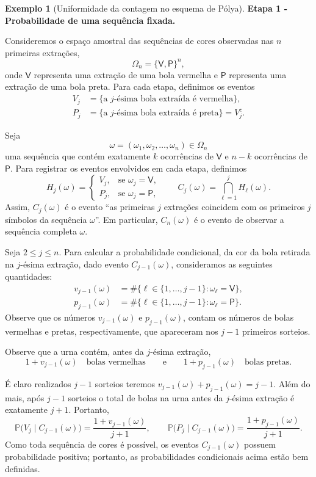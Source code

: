 \documentclass[12pt,portuguese]{article}
\theoremstyle{definition}
\newtheorem{example}[example]{Exemplo}
\begin{document}
\begin{example}[Uniformidade da contagem no esquema de Pólya]
\smallskip
\noindent\textbf{Etapa 1 - Probabilidade de uma sequência fixada.}

Consideremos o espaço amostral das sequências de cores observadas nas $n$ primeiras extrações,
\[
  \Omega_n = \{\mathsf{V},\mathsf{P}\}^n,
\]
onde $\mathsf{V}$ representa uma extração de uma bola vermelha e $\mathsf{P}$ representa uma extração de uma bola preta. Para cada etapa, definimos os eventos
\[
  \begin{aligned}
    V_j &= \{\text{a $j$-ésima bola extraída é vermelha}\}, \\
    P_j &= \{\text{a $j$-ésima bola extraída é preta}\}=V_j^c.
  \end{aligned}
\]

Seja
\[
  \omega=(\omega_1,\omega_2,\ldots,\omega_n) \in \Omega_n
\]
uma sequência que contém exatamente $k$ ocorrências de $\mathsf{V}$ e $n-k$ ocorrências de $\mathsf{P}$. Para registrar os eventos envolvidos em cada etapa, definimos
\[
  H_j(\omega) =
  \begin{cases}
    V_j, & \text{se } \omega_j=\mathsf{V}, \\
    P_j, & \text{se } \omega_j=\mathsf{P},
  \end{cases}
  \qquad
  C_j(\omega)=\displaystyle\bigcap_{\ell=1}^j H_\ell(\omega).
\]
Assim, $C_j(\omega)$ é o evento ``as primeiras $j$ extrações coincidem com os primeiros $j$ símbolos da sequência $\omega$''. Em particular, $C_n(\omega)$ é o evento de observar a sequência completa $\omega$.

Seja $2\leqslant j\leqslant n$.
Para calcular a probabilidade condicional, da cor da bola retirada na $j$-ésima extração, 
dado evento $C_{j-1}(\omega)$, consideramos as seguintes quantidades:
\[
  \begin{aligned}
    v_{j-1}(\omega)
    &=\#\{\ell\in\{1,\ldots,j-1\}:\omega_\ell=\mathsf{V}\}, \\
    p_{j-1}(\omega)
    &=\#\{\ell\in\{1,\ldots,j-1\}:\omega_\ell=\mathsf{P}\}.
  \end{aligned}
\]
Observe que os números $v_{j-1}(\omega)$ e $p_{j-1}(\omega)$,
contam os números de bolas vermelhas e pretas, respectivamente, 
que apareceram nos $j-1$ primeiros sorteios. 

Observe que a urna contém, antes da $j$-ésima extração,
\[
  1+v_{j-1}(\omega) \quad \text{bolas vermelhas}
  \qquad\text{e}\qquad
  1+p_{j-1}(\omega) \quad \text{bolas pretas}.
\]

É claro realizados $j-1$ sorteios teremos $v_{j-1}(\omega)+p_{j-1}(\omega)=j-1$.
Além do mais, após $j-1$ sorteios o total de bolas na urna antes da $j$-ésima extração é exatamente
$j+1$. Portanto,
\begin{equation}\label{eq:polya-condicionais}
  \mathbb{P}\big(V_j\mid C_{j-1}(\omega)\big)
  =\frac{1+v_{j-1}(\omega)}{j+1},
  \qquad
  \mathbb{P}\big(P_j\mid C_{j-1}(\omega)\big)
  =\frac{1+p_{j-1}(\omega)}{j+1}.
\end{equation}
Como toda sequência de cores é possível, os eventos $C_{j-1}(\omega)$ possuem probabilidade positiva; portanto, as probabilidades condicionais acima estão bem definidas.


\end{example}
\end{document}
